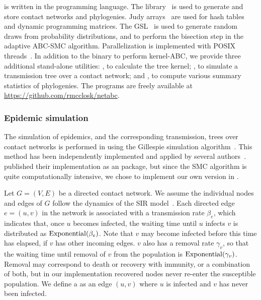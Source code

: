  is written in the  programming language. The
 library~\autocite{csardi2006igraph} is used to generate and
store contact networks and phylogenies. Judy arrays~\autocite{baskins2004judy}
are used for hash tables and dynamic programming matrices. The
\gls{GSL}~\autocite{gough2009gnu} is used to generate random draws from
probability distributions, and to perform the bisection step in the adaptive
\gls{ABC}-\gls{SMC} algorithm. Parallelization is implemented with POSIX
threads~\autocite{barney2009posix}. In addition to the  binary
to perform kernel-\gls{ABC}, we provide three additional stand-alone utilities:
, to calculate the tree kernel; , to
simulate a transmission tree over a contact network; and ,
to compute various summary statistics of phylogenies. The programs are freely
available at \url{https://github.com/rmcclosk/netabc}.

\subsubsection*{Epidemic simulation}
\label{subsubsec:nettree}

The simulation of epidemics, and the corresponding transmission, trees over
contact networks is performed in  using the Gillespie
simulation algorithm~\autocite{gillespie1976general}. This method has been
independently implemented and applied by several
authors~\autocite[\textit{e.g.}][]{o2011contact, robinson2013dynamics,
leventhal2012inferring, groendyke2011bayesian, villandre2016assessment}.
\textcite{groendyke2011bayesian} published their implementation as an
 package, but since the \gls{SMC} algorithm is quite
computationally intensive, we chose to implement our own version in
.

Let $G = (V, E)$ be a directed contact network. We assume the individual nodes
and edges of $G$ follow the dynamics of the \gls{SIR}
model~\autocite{kermack1927contribution}. Each directed edge $e = (u, v)$ in
the network is associated with a transmission rate $\beta_e$, which indicates
that, once $u$ becomes infected, the waiting time until $u$ infects $v$ is
distributed as $\operatorname{Exponential}(\beta_e)$. Note that $v$ may become infected
before this time has elapsed, if $v$ has other incoming edges. $v$ also has a
removal rate $\gamma_v$, so that the waiting time until removal of $v$ from the
population is $\operatorname{Exponential}(\gamma_v)$. Removal may correspond to death or
recovery with immunity, or a combination of both, but in our implementation
recovered nodes never re-enter the susceptible population. We define a
 as an edge $(u, v)$ where $u$ is infected and $v$ has
never been infected.

